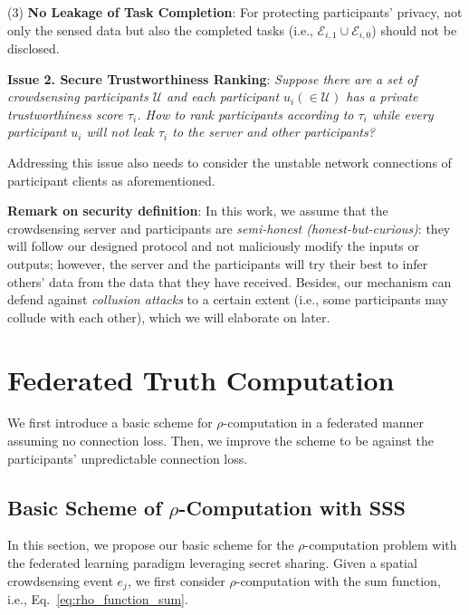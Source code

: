 (3) \textbf{No Leakage of Task Completion}: For protecting participants' privacy, not only the sensed data but also the completed tasks (i.e., $\mathcal E_{i,1} \cup \mathcal E_{i,0}$) should not be disclosed.

\vspace{+.5em}
\noindent \textbf{Issue 2. Secure Trustworthiness Ranking}: \textit{Suppose there are a set of crowdsensing participants $\mathcal U$ and each participant $u_i (\in \mathcal U)$ has a private trustworthiness score $\tau_i$. How to rank participants according to $\tau_i$ while every participant $u_i$ will not leak $\tau_i$ to the server and other participants?}

Addressing this issue also needs to consider the unstable network connections of participant clients as aforementioned.


\textbf{Remark on security definition}: In this work, we assume that the crowdsensing server and participants are \textit{semi-honest (honest-but-curious)}: they will follow our designed protocol and not maliciously modify the inputs or outputs; however, the server and the participants will try their best to infer others' data from the data that they have received. Besides, our mechanism can defend against \textit{collusion attacks} to a certain extent (i.e., some participants may collude with each other), which we will elaborate on later.

\section{Federated Truth Computation}
\label{sec:truth_computation}

We first introduce a basic scheme for $\rho$-computation in a federated manner assuming no connection loss. Then, we improve the scheme to be against the participants' unpredictable connection loss. %

\subsection{Basic Scheme of $\rho$-Computation with SSS} 
\label{sub:basic_rho_computation}

In this section, we propose our basic scheme for the $\rho$-computation problem with the federated learning paradigm leveraging secret sharing. Given a spatial crowdsensing event $e_j$, we first consider $\rho$-computation with the sum function, i.e., Eq.~\ref{eq:rho_function_sum}. 

